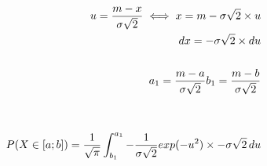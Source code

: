 \documentclass[preview]{standalone}
\begin{document}
\begin{align*}
u = {{m - x} \over {\sigma \sqrt{2}} } \iff x = m - \sigma \sqrt{2} \times u \\ dx = - \sigma \sqrt{2} \times du \\ \\ a_1 = {{m - a} \over {\sigma \sqrt{2}} } b_1 = {{m - b} \over {\sigma \sqrt{2}} } \\ \\ \\ P( X \in [a;b] ) = { \frac{1}{\sqrt{\pi}} } \int_{b_1}^{a_1} { { - \frac{1}{\sigma \sqrt{2}} } exp( -u^2 ) \times - \sigma \sqrt{2} } \, du
\end{align*}
\end{document}
